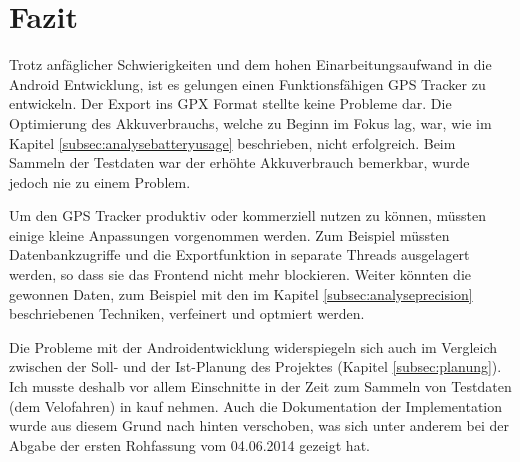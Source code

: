 \clearpage
\section{Fazit}
Trotz anfäglicher Schwierigkeiten und dem hohen Einarbeitungsaufwand in die Android Entwicklung, ist es gelungen einen Funktionsfähigen GPS Tracker zu entwickeln. Der Export ins GPX Format stellte keine Probleme dar. Die Optimierung des Akkuverbrauchs, welche zu Beginn im Fokus lag, war, wie im Kapitel \ref{subsec:analysebatteryusage} beschrieben, nicht erfolgreich. Beim Sammeln der Testdaten war der erhöhte Akkuverbrauch bemerkbar, wurde jedoch nie zu einem Problem.

Um den GPS Tracker produktiv oder kommerziell nutzen zu können, müssten einige kleine Anpassungen vorgenommen werden. Zum Beispiel müssten Datenbankzugriffe und die Exportfunktion in separate Threads ausgelagert werden, so dass sie das Frontend nicht mehr blockieren. Weiter könnten die gewonnen Daten, zum Beispiel mit den im Kapitel \ref{subsec:analyseprecision} beschriebenen Techniken, verfeinert und optmiert werden.

Die Probleme mit der Androidentwicklung widerspiegeln sich auch im Vergleich zwischen der Soll- und der Ist-Planung des Projektes (Kapitel \ref{subsec:planung}). Ich musste deshalb vor allem Einschnitte in der Zeit zum Sammeln von Testdaten (dem Velofahren) in kauf nehmen. Auch die Dokumentation der Implementation wurde aus diesem Grund nach hinten verschoben, was sich unter anderem bei der Abgabe der ersten Rohfassung vom 04.06.2014 gezeigt hat.